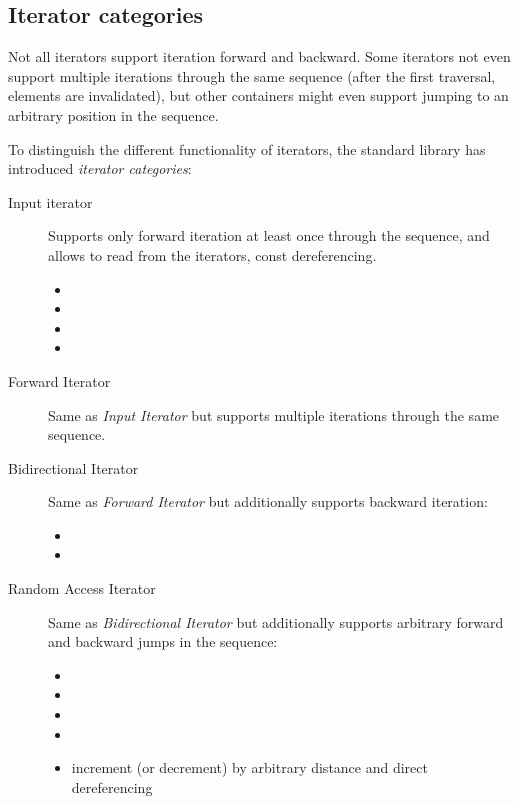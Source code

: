 \subsection{Iterator categories}
Not all iterators support iteration forward and backward. Some iterators not even support multiple iterations through the same sequence
(after the first traversal, elements are invalidated), but other containers might even support jumping to an arbitrary position in the
sequence.

To distinguish the different functionality of iterators, the standard library has introduced \emph{iterator categories}:
\begin{description}
  \item[Input iterator]
    Supports only forward iteration at least once through the sequence, and allows to read from the iterators, \ie const dereferencing.
    \begin{itemize}
      \item {}
      \item {}
      \item {}
      \item {}
    \end{itemize}
  \item[Forward Iterator]
    Same as \emph{Input Iterator} but supports multiple iterations through the same sequence.
  \item[Bidirectional Iterator]
    Same as \emph{Forward Iterator} but additionally supports backward iteration:
    \begin{itemize}
      \item {}
      \item {}
    \end{itemize}
  \item[Random Access Iterator]
    Same as \emph{Bidirectional Iterator} but additionally supports arbitrary forward and backward jumps in the sequence:
    \begin{itemize}
      \item {}
      \item {}
      \item {}
      \item {}
      \item {} increment (or decrement) by arbitrary distance and direct dereferencing

\end{itemize}
\end{description}
